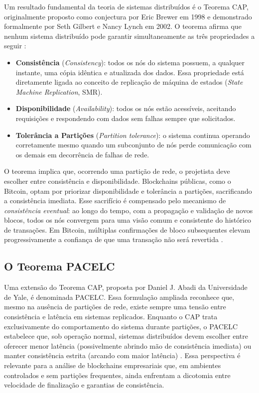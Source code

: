\documentclass[12pt,a4paper]{report}
\begin{document}
Um resultado fundamental da teoria de sistemas distribuídos é o Teorema CAP, originalmente proposto como conjectura por Eric Brewer em 1998 e demonstrado formalmente por Seth Gilbert e Nancy Lynch em 2002. O teorema afirma que nenhum sistema distribuído pode garantir simultaneamente as três propriedades a seguir \cite{Bashir2023}:

\begin{itemize}
    \item \textbf{Consistência} (\textit{Consistency}): todos os nós do sistema possuem, a qualquer instante, uma cópia idêntica e atualizada dos dados. Essa propriedade está diretamente ligada ao conceito de replicação de máquina de estados (\textit{State Machine Replication}, SMR).
    \item \textbf{Disponibilidade} (\textit{Availability}): todos os nós estão acessíveis, aceitando requisições e respondendo com dados sem falhas sempre que solicitados.
    \item \textbf{Tolerância a Partições} (\textit{Partition tolerance}): o sistema continua operando corretamente mesmo quando um subconjunto de nós perde comunicação com os demais em decorrência de falhas de rede.
\end{itemize}

O teorema implica que, ocorrendo uma partição de rede, o projetista deve escolher entre consistência e disponibilidade. Blockchains públicas, como o Bitcoin, optam por priorizar disponibilidade e tolerância a partições, sacrificando a consistência imediata. Esse sacrifício é compensado pelo mecanismo de \textit{consistência eventual}: ao longo do tempo, com a propagação e validação de novos blocos, todos os nós convergem para uma visão comum e consistente do histórico de transações. Em Bitcoin, múltiplas confirmações de bloco subsequentes elevam progressivamente a confiança de que uma transação não será revertida \cite{Bashir2023}.

\subsection{O Teorema PACELC}

Uma extensão do Teorema CAP, proposta por Daniel J. Abadi da Universidade de Yale, é denominada PACELC. Essa formulação ampliada reconhece que, mesmo na ausência de partições de rede, existe sempre uma tensão entre consistência e latência em sistemas replicados. Enquanto o CAP trata exclusivamente do comportamento do sistema durante partições, o PACELC estabelece que, sob operação normal, sistemas distribuídos devem escolher entre oferecer menor latência (possivelmente abrindo mão de consistência imediata) ou manter consistência estrita (arcando com maior latência) \cite{Bashir2023}. Essa perspectiva é relevante para a análise de blockchains empresariais que, em ambientes controlados e sem partições frequentes, ainda enfrentam a dicotomia entre velocidade de finalização e garantias de consistência.
\end{document}
